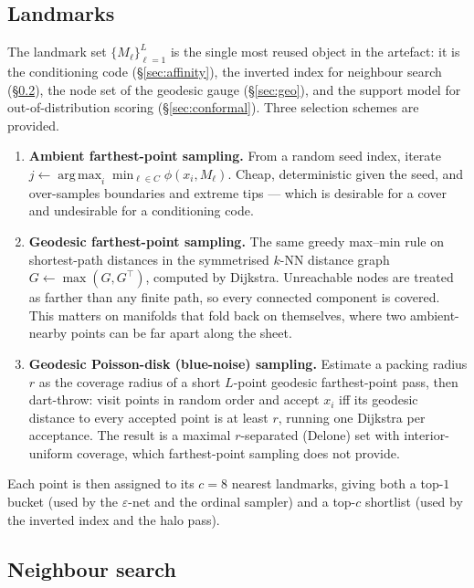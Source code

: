 \documentclass[12pt]{iopart}
\theoremstyle{definition}
\theoremstyle{plain}
\theoremstyle{remark}
\DeclareMathOperator*{\argmax}{arg\,max}
\begin{document}
\subsection{Landmarks}
\label{sec:landmarks}

The landmark set $\{M_\ell\}_{\ell=1}^L$ is the single most reused object in
the artefact: it is the conditioning code (\S\ref{sec:affinity}), the inverted
index for neighbour search (\S\ref{sec:knn}), the node set of the geodesic gauge
(\S\ref{sec:geo}), and the support model for out-of-distribution scoring
(\S\ref{sec:conformal}). Three selection schemes are provided.

\begin{enumerate}[leftmargin=*]
\item \textbf{Ambient farthest-point sampling.} From a random seed index,
  iterate $j\leftarrow\argmax_i\min_{\ell\in C}\phi(x_i,M_\ell)$. Cheap,
  deterministic given the seed, and over-samples boundaries and extreme tips
  --- which is desirable for a cover and undesirable for a conditioning code.
\item \textbf{Geodesic farthest-point sampling.} The same greedy max--min rule
  on shortest-path distances in the symmetrised $k$-NN distance graph
  $G\leftarrow\max(G,G^\top)$, computed by Dijkstra. Unreachable nodes are
  treated as farther than any finite path, so every connected component is
  covered. This matters on manifolds that fold back on themselves, where two
  ambient-nearby points can be far apart along the sheet.
\item \textbf{Geodesic Poisson-disk (blue-noise) sampling.} Estimate a packing
  radius $r$ as the coverage radius of a short $L$-point geodesic
  farthest-point pass, then dart-throw: visit points in random order and accept
  $x_i$ iff its geodesic distance to every accepted point is at least $r$,
  running one Dijkstra per acceptance. The result is a maximal $r$-separated
  (Delone) set with interior-uniform coverage, which farthest-point sampling
  does not provide.
\end{enumerate}

Each point is then assigned to its $c=8$ nearest landmarks, giving both a
top-$1$ bucket (used by the $\varepsilon$-net and the ordinal sampler) and a
top-$c$ shortlist (used by the inverted index and the halo pass).

\subsection{Neighbour search}
\label{sec:knn}
\end{document}
